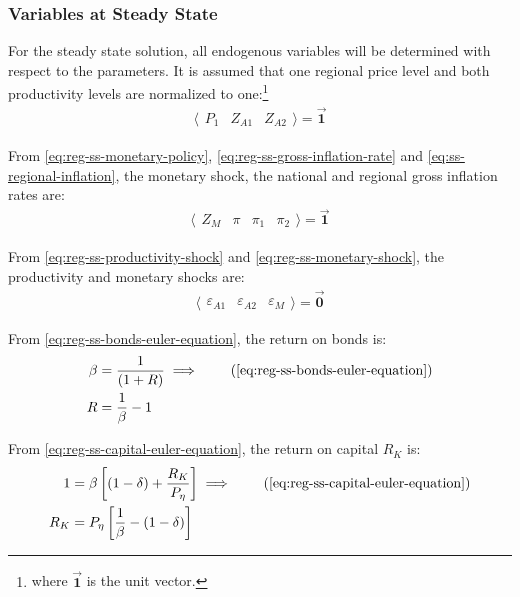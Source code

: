 \documentclass[../thesis.tex]{subfiles}
\begin{document}

\subsubsection{Variables at Steady State}

	For the steady state solution, all endogenous variables will be determined with respect to the parameters. It is assumed that one regional price level and both productivity levels are normalized to one:\footnote{where $\vec{\bm{1}}$ is the unit vector.}
	\begin{align}
		\langle \begin{matrix} P_{1} & Z_{A1} & Z_{A2} \end{matrix} \rangle = \vec{\bm{1}} \label{eq:reg-ss-p1-za1}
	\end{align}
	
	From \ref{eq:reg-ss-monetary-policy}, \ref{eq:reg-ss-gross-inflation-rate} and \ref{eq:ss-regional-inflation}, the monetary shock, the national and regional gross inflation rates are:
	\begin{align}
		\langle \begin{matrix} Z_{M} & \pi & \pi_{1} & \pi_{2} \end{matrix} \rangle  = \vec{\bm{1}}
	\end{align}
	
	From \ref{eq:reg-ss-productivity-shock} and \ref{eq:reg-ss-monetary-shock}, the productivity and monetary shocks are:
	\begin{align}
		\langle \begin{matrix} \varepsilon_{A1} & \varepsilon_{A2} & \varepsilon_{M} \end{matrix} \rangle = \vec{\bm{0}} \label{eq:reg-ss-epsilon}
	\end{align}
	
	From \ref{eq:reg-ss-bonds-euler-equation}, the return on bonds is:
	\begin{align}
		\beta &= \frac{1}{(1 + R)} \implies \tag{\ref{eq:reg-ss-bonds-euler-equation}} \\
		R &= \frac{1}{\beta} - 1 \label{eq:reg-ss-R}
	\end{align}
	
	From \ref{eq:reg-ss-capital-euler-equation}, the return on capital $R_K$ is:
	\begin{align}
		1 &= \beta \left[ (1-\delta) + \frac{R_K}{P_{\eta}} \right] \implies \tag{\ref{eq:reg-ss-capital-euler-equation}} \\
		R_K &= P_{\eta} \left[ \frac{1}{\beta} - (1-\delta) \right] \label{eq:reg-ss-RK}
	\end{align}
\end{document}
